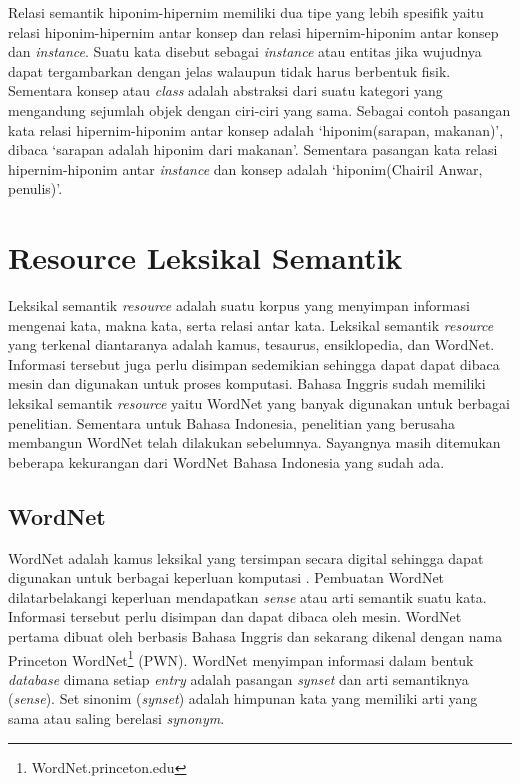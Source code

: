 Relasi semantik hiponim-hipernim memiliki dua tipe yang lebih spesifik yaitu relasi hiponim-hipernim antar konsep dan relasi hipernim-hiponim antar konsep dan \textit{instance}. Suatu kata disebut sebagai \textit{instance} atau entitas jika wujudnya dapat tergambarkan dengan jelas walaupun tidak harus berbentuk fisik. Sementara konsep atau \textit{class} adalah abstraksi dari suatu kategori yang mengandung sejumlah objek dengan ciri-ciri yang sama. Sebagai contoh pasangan kata relasi hipernim-hiponim antar konsep adalah `hiponim(sarapan, makanan)', dibaca `sarapan adalah hiponim dari makanan'. Sementara pasangan kata relasi hipernim-hiponim antar \textit{instance} dan konsep adalah `hiponim(Chairil Anwar, penulis)'.


\section{Resource Leksikal Semantik}
Leksikal semantik \textit{resource} adalah suatu korpus yang menyimpan informasi mengenai kata, makna kata, serta relasi antar kata. Leksikal semantik \textit{resource} yang terkenal diantaranya adalah kamus, tesaurus, ensiklopedia, dan WordNet. Informasi tersebut juga perlu disimpan sedemikian sehingga dapat dapat dibaca mesin dan digunakan untuk proses komputasi. Bahasa Inggris sudah memiliki leksikal semantik \textit{resource} yaitu WordNet yang banyak digunakan untuk berbagai penelitian. Sementara untuk Bahasa Indonesia, penelitian yang berusaha membangun WordNet telah dilakukan sebelumnya. Sayangnya masih ditemukan beberapa kekurangan dari WordNet Bahasa Indonesia yang sudah ada. 

\subsection{WordNet}
WordNet adalah kamus leksikal yang tersimpan secara digital sehingga dapat digunakan untuk berbagai keperluan komputasi \citep{miller1995wordnet}. Pembuatan WordNet dilatarbelakangi keperluan mendapatkan \textit{sense} atau arti semantik suatu kata. Informasi tersebut perlu disimpan dan dapat dibaca oleh mesin. WordNet pertama dibuat oleh \cite{miller1995wordnet} berbasis Bahasa Inggris dan sekarang dikenal dengan nama Princeton WordNet\footnote{WordNet.princeton.edu} (PWN). WordNet menyimpan informasi dalam bentuk \textit{database} dimana setiap \textit{entry} adalah pasangan \textit{synset} dan arti semantiknya (\textit{sense}). Set sinonim (\textit{synset}) adalah himpunan kata yang memiliki arti yang sama atau saling berelasi \textit{synonym}. 


